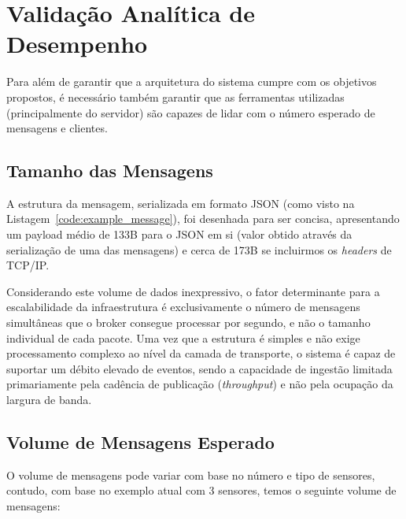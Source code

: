 
\section{Validação Analítica de Desempenho}

Para além de garantir que a arquitetura do sistema cumpre com os objetivos propostos, é necessário também garantir que as ferramentas utilizadas (principalmente do servidor) são capazes de lidar com o número esperado de mensagens e clientes.

\subsection{Tamanho das Mensagens}

A estrutura da mensagem, serializada em formato \ac{JSON} (como visto na Listagem~\ref{code:example_message}), foi desenhada para ser concisa, apresentando um payload médio de 133B para o \ac{JSON} em si (valor obtido através da serialização de uma das mensagens) e cerca de 173B se incluirmos os \textit{headers} de TCP/IP.

Considerando este volume de dados inexpressivo, o fator determinante para a escalabilidade da infraestrutura é exclusivamente o número de mensagens simultâneas que o broker consegue processar por segundo, e não o tamanho individual de cada pacote. Uma vez que a estrutura é simples e não exige processamento complexo ao nível da camada de transporte, o sistema é capaz de suportar um débito elevado de eventos, sendo a capacidade de ingestão limitada primariamente pela cadência de publicação (\textit{throughput}) e não pela ocupação da largura de banda.

\subsection{Volume de Mensagens Esperado}

O volume de mensagens pode variar com base no número e tipo de sensores, contudo, com base no exemplo atual com 3 sensores, temos o seguinte volume de mensagens:
    
